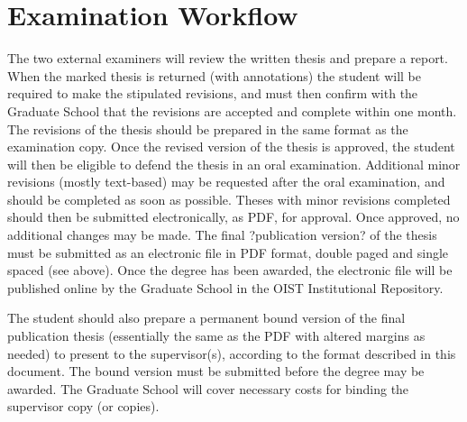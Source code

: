 \section{Examination Workflow}

The two external examiners will review the written thesis and prepare a report.  When the marked thesis is returned (with annotations) the student will be required to make the stipulated revisions, and must then confirm with the Graduate School that the revisions are accepted and complete within one month.  The revisions of the thesis should be prepared in the same format as the examination copy. Once the revised version of the thesis is approved, the student will then be eligible to defend the thesis in an oral examination.  Additional minor revisions (mostly text-based) may be requested after the oral examination, and should be completed as soon as possible.  Theses with minor revisions completed should then be submitted electronically, as PDF, for approval.  Once approved, no additional changes may be made.  The final ?publication version? of the thesis must be submitted as an electronic file in PDF format, double paged and single spaced (see above).  Once the degree has been awarded, the electronic file will be published online by the Graduate School in the OIST Institutional Repository.

The student should also prepare a permanent bound version of the final publication thesis (essentially the same as the PDF with altered margins as needed) to present to the supervisor(s), according to the format described in this document.  The bound version must be submitted before the degree may be awarded.  The Graduate School will cover necessary costs for binding the supervisor copy (or copies).
